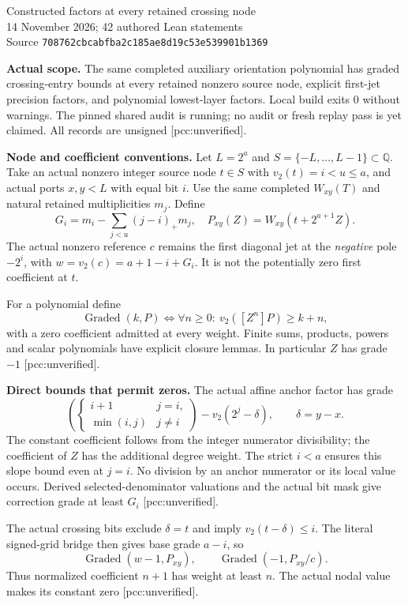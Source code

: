 \documentclass[10pt]{article}
\begin{document}
\begin{center}
{\Large Constructed factors at every retained crossing node}\\[4pt]
14 November 2026; 42 authored Lean statements\\
Source \texttt{708762cbcabfba2c185ae8d19c53e539901b1369}
\end{center}
\textbf{Actual scope.} The same completed auxiliary orientation polynomial
has graded crossing-entry bounds at every retained nonzero source node,
explicit first-jet precision factors, and polynomial lowest-layer factors.
Local build exits 0 without warnings. The pinned shared audit is running;
no audit or fresh replay pass is yet claimed. All records are unsigned
[pcc:unverified].

\textbf{Node and coefficient conventions.} Let $L=2^a$ and
$S=\{-L,\ldots,L-1\}\subset\mathbb Q$. Take an actual nonzero integer
source node $t\in S$ with $v_2(t)=i<u\le a$, and actual ports $x,y<L$
with equal bit $i$. Use the same completed $W_{xy}(T)$ and natural retained
multiplicities $m_j$. Define
\[
 G_i=m_i-\sum_{j<u}(j-i)_+m_j,\quad
 P_{xy}(Z)=W_{xy}(t+2^{a+1}Z).
\]
The actual nonzero reference $c$ remains the first diagonal jet at the
\emph{negative} pole $-2^i$, with $w=v_2(c)=a+1-i+G_i$.
It is not the potentially zero first coefficient at $t$.

For a polynomial define
\[
 \operatorname{Graded}(k,P)\iff
 \forall n\ge0:\ v_2([Z^n]P)\ge k+n,
\]
with a zero coefficient admitted at every weight. Finite sums, products,
powers and scalar polynomials have explicit closure lemmas. In particular
$Z$ has grade $-1$ [pcc:unverified].

\textbf{Direct bounds that permit zeros.} The actual affine anchor factor
has grade
\[
 \left(\begin{cases}i+1&j=i,\\\min(i,j)&j\ne i\end{cases}\right)
 -v_2(2^j-\delta),\qquad\delta=y-x.
\]
The constant coefficient follows from the integer numerator divisibility;
the coefficient of $Z$ has the additional degree weight. The strict $i<a$
ensures this slope bound even at $j=i$. No division by an anchor numerator
or its local value occurs. Derived selected-denominator valuations and the
actual bit mask give correction grade at least $G_i$ [pcc:unverified].

The actual crossing bits exclude $\delta=t$ and imply
$v_2(t-\delta)\le i$. The literal signed-grid bridge then gives base grade
$a-i$, so
\[
 \operatorname{Graded}(w-1,P_{xy}),\qquad
 \operatorname{Graded}(-1,P_{xy}/c).
\]
Thus normalized coefficient $n+1$ has weight at least $n$. The actual nodal
value makes its constant zero [pcc:unverified].
\end{document}
